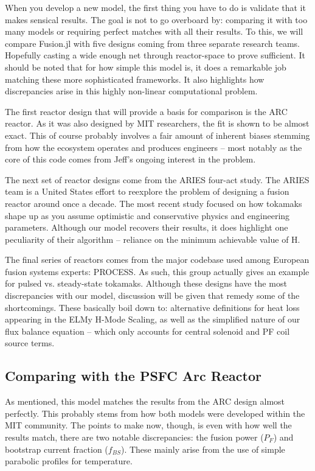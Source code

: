 When you develop a new model, the first thing you have to do is validate that it makes sensical results. The goal is not to go overboard by: comparing it with too many models or requiring perfect matches with all their results. To this, we will compare Fusion.jl with five designs coming from three separate research teams. Hopefully casting a wide enough net through reactor-space to prove sufficient. It should be noted that for how simple this model is, it does a remarkable job matching these more sophisticated frameworks. It also highlights how discrepancies arise in this highly non-linear computational problem.

The first reactor design that will provide a basis for comparison is the ARC reactor. As it was also designed by MIT researchers, the fit is shown to be almost exact. This of course probably involves a fair amount of inherent biases stemming from how the ecosystem operates and produces engineers -- most notably as the core of this code comes from Jeff's ongoing interest in the problem.

The next set of reactor designs come from the ARIES four-act study. The ARIES team is a United States effort to reexplore the problem of designing a fusion reactor around once a decade. The most recent study focused on how tokamaks shape up as you assume optimistic and conservative physics and engineering parameters. Although our model recovers their results, it does highlight one peculiarity of their algorithm -- reliance on the minimum achievable value of H.

The final series of reactors comes from the major codebase used among European fusion systems experts: PROCESS. As such, this group actually gives an example for pulsed vs. steady-state tokamaks. Although these designs have the most discrepancies with our model, discussion will be given that remedy some of the shortcomings. These basically boil down to: alternative definitions for heat loss appearing in the ELMy H-Mode Scaling, as well as the simplified nature of our flux balance equation -- which only accounts for central solenoid and PF coil source terms. 

\newpage 

\subsection{Comparing with the PSFC Arc Reactor}

As mentioned, this model matches the results from the ARC design almost perfectly. This probably stems from how both models were developed within the MIT community.  The points to make now, though, is even with how well the results match, there are two notable discrepancies: the fusion power ($P_F$) and bootstrap current fraction ($f_{BS}$). These mainly arise from the use of simple parabolic profiles for temperature.

